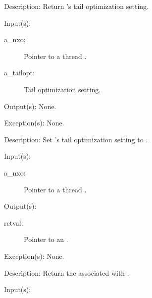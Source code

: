 \begin{capi}
\begin{capilist}
	\item[Description: ]
		Return 's tail optimization setting.
	\end{capilist}
\label{nxo_thread_tailopt_set}
	\begin{capilist}
	\item[Input(s): ]
		\begin{description}\item[]
		\item[a\_nxo: ]
			Pointer to a thread .
		\item[a\_tailopt: ]
			Tail optimization setting.
		\end{description}
	\item[Output(s): ] None.
	\item[Exception(s): ] None.
	\item[Description: ]
		Set 's tail optimization setting to
		.
	\end{capilist}
\label{nxo_thread_nx_get}
	\begin{capilist}
	\item[Input(s): ]
		\begin{description}\item[]
		\item[a\_nxo: ]
			Pointer to a thread \classname{nxo}.
		\end{description}
	\item[Output(s): ]
		\begin{description}\item[]
		\item[retval: ]
			Pointer to an \classname{nx}.
		\end{description}
	\item[Exception(s): ] None.
	\item[Description: ]
		Return the  associated with \cvar{a\_nxo}.
	\end{capilist}
\label{nxo_thread_userdict_get}
	\begin{capilist}
	\item[Input(s): ]
		\begin{description}\item[]

\end{description}
\end{capilist}
\end{capi}
